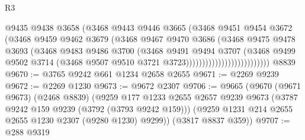 \begin{lexlean}{R3}
\begin{coremodule}
                                      @9435
                                      @9438
                                      @3658
                                      (@3468
                                        @9443
                                        @9446
                                        @3665
                                        (@3468
                                          @9451
                                          @9454
                                          @3672
                                          (@3468
                                            @9459
                                            @9462
                                            @3679
                                            (@3468
                                              @9467
                                              @9470
                                              @3686
                                              (@3468
                                                @9475
                                                @9478
                                                @3693
                                                (@3468
                                                  @9483
                                                  @9486
                                                  @3700
                                                  (@3468
                                                    @9491
                                                    @9494
                                                    @3707
                                                    (@3468
                                                      @9499
                                                      @9502
                                                      @3714
                                                      (@3468
                                                        @9507
                                                        @9510
                                                        @3721
                                                        @3723))))))))))))))))))))))))))
    @8839
@9670 := @3765 @9242 @661 @1234 @2658 @2655
@9671 := @2269 @9239
@9672 := @2269 @1230
@9673 := @9672 @2307
@9706 := @9665
    (@9670
      (@9671 @9673)
      (@2468 @8839)
      (@9259
        @177
        @1233
        @2655
        @2657
        @9239
        @9673
        (@3787 @9242 @159 @9239 (@3792 (@3793 @9242 @159)))
        (@9259 @1231 @214 @2655 @2655 @1230 @2307 (@9280 @1230) @9299))
      (@3817 @8837 @359))
@9707 := @288 @9319

\end{coremodule}
\end{lexlean}
